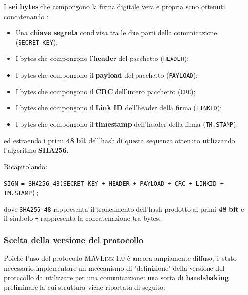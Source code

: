\documentclass[a4paper, 12pt, oneside]{article}
\theoremstyle{definition}
\begin{document}
I \textbf{sei bytes} che compongono la firma digitale vera e propria sono ottenuti concatenando \cite{sign-algorithm}:

\begin{itemize}
    \item Una \textbf{chiave segreta} condivisa tra le due parti della comunicazione (\texttt{SECRET\_KEY});
    \item I bytes che compongono l'\textbf{header} del pacchetto (\texttt{HEADER});
    \item I bytes che compongono il \textbf{payload} del pacchetto (\texttt{PAYLOAD});
    \item I bytes che compongono il \textbf{CRC} dell'intero pacchetto (\texttt{CRC});
    \item I bytes che compongono il \textbf{Link ID} dell'header della firma (\texttt{LINKID});
    \item I bytes che compongono il \textbf{timestamp} dell'header della firma (\texttt{TM.STAMP}).
\end{itemize}

ed estraendo i primi \textbf{48 bit} dell'hash di questa sequenza ottenuto utilizzando l'algoritmo \textbf{SHA256}.

Ricapitolando:

\begin{center}
    \texttt{SIGN = SHA256\_48(SECRET\_KEY + HEADER + PAYLOAD + CRC + LINKID + TM.STAMP);}
\end{center}

dove \texttt{SHA256\_48} rappresenta il troncamento dell'hash prodotto ai primi \textbf{48 bit} e il simbolo \texttt{+} rappresenta la concatenazione tra bytes.

\newpage
\subsubsection{Scelta della versione del protocollo}
Poiché l'uso del protocollo \textsc{MAVLink} 1.0 è ancora ampiamente diffuso, è stato necessario implementare un meccanismo di "definizione" della versione del protocollo da utilizzare per una comunicazione: una sorta di \textbf{handshaking} \cite{version-handshaking} preliminare la cui struttura viene riportata di seguito:
\end{document}
